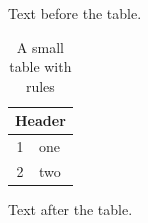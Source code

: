 \documentclass{article}
\begin{document}
Text before the table.

\begin{table}[h]\centering\small\caption{A small table with rules}\begin{tabular}{|c|l|}\hline \multicolumn{2}{|c|}{Header}\\\hline 1 & one\\2 & two\\\hline\end{tabular}\end{table}

Text after the table.
\end{document}
